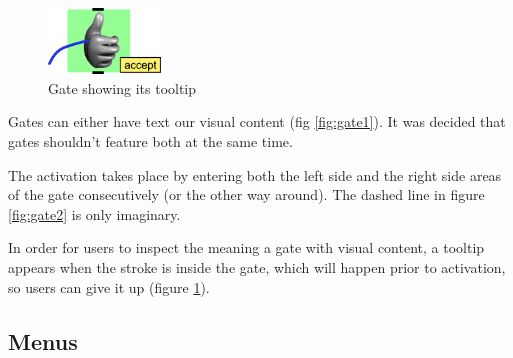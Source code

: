 \begin{figure}[!ht]
		\vspace{-0.7cm}
		\centering
		\includegraphics[width=3cm]{gfx/gate3e.png}
		\vspace{-0.5cm}
		\caption{Gate showing its tooltip}
		\label{fig:gate3}
\end{figure}


Gates can either have text our visual content (fig \ref{fig:gate1}).
It was decided that gates shouldn't feature both at the same time.

The activation takes place by entering both the left side and the right
side areas of the gate consecutively (or the other way around).
The dashed line in figure \ref{fig:gate2} is only imaginary.

In order for users to inspect the meaning a gate with visual content, a
tooltip appears when the stroke is inside the gate,
which will happen prior to activation, so users can give it up (figure \ref{fig:gate3}).



\subsection{Menus}

